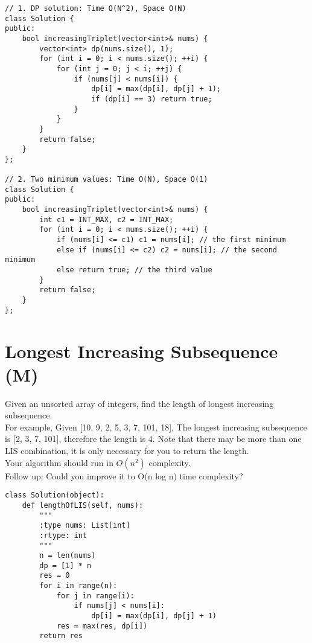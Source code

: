 \begin{lstlisting}
// 1. DP solution: Time O(N^2), Space O(N)
class Solution {
public:
    bool increasingTriplet(vector<int>& nums) {
        vector<int> dp(nums.size(), 1);
        for (int i = 0; i < nums.size(); ++i) {
            for (int j = 0; j < i; ++j) {
                if (nums[j] < nums[i]) {
                    dp[i] = max(dp[i], dp[j] + 1);
                    if (dp[i] == 3) return true;
                }
            }
        }
        return false;
    }
};

// 2. Two minimum values: Time O(N), Space O(1)
class Solution {
public:
    bool increasingTriplet(vector<int>& nums) {
        int c1 = INT_MAX, c2 = INT_MAX;
        for (int i = 0; i < nums.size(); ++i) {
            if (nums[i] <= c1) c1 = nums[i]; // the first minimum
            else if (nums[i] <= c2) c2 = nums[i]; // the second minimum
            else return true; // the third value
        }
        return false;
    }
};
\end{lstlisting}


\section{Longest Increasing Subsequence (M)}
Given an unsorted array of integers, find the length of longest increasing subsequence.\\

For example,
Given [10, 9, 2, 5, 3, 7, 101, 18],
The longest increasing subsequence is [2, 3, 7, 101], therefore the length is 4. Note that there may be more than one LIS combination, it is only necessary for you to return the length.\\

Your algorithm should run in $O(n^2)$ complexity.\\

Follow up: Could you improve it to O(n log n) time complexity? \\

\begin{lstlisting}
class Solution(object):
    def lengthOfLIS(self, nums):
        """
        :type nums: List[int]
        :rtype: int
        """
        n = len(nums)
        dp = [1] * n
        res = 0
        for i in range(n):
            for j in range(i):
                if nums[j] < nums[i]:
                    dp[i] = max(dp[i], dp[j] + 1)
            res = max(res, dp[i])
        return res
\end{lstlisting}

